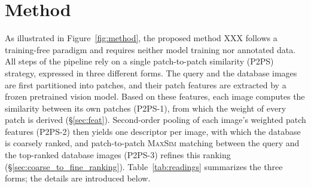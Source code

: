 \section{Method}
\label{sec:method}
As illustrated in Figure~\ref{fig:method}, the proposed method XXX follows a training-free paradigm and requires neither model training nor annotated data. All steps of the pipeline rely on a single patch-to-patch similarity (P2PS) strategy, expressed in three different forms. The query and the database images are first partitioned into patches, and their patch features are extracted by a frozen pretrained vision model. Based on these features, each image computes the similarity between its own patches (P2PS-1), from which the weight of every patch is derived (\S\ref{sec:feat}). Second-order pooling of each image's weighted patch features (P2PS-2) then yields one descriptor per image, with which the database is coarsely ranked, and patch-to-patch \textsc{MaxSim} matching between the query and the top-ranked database images (P2PS-3) refines this ranking (\S\ref{sec:coarse_to_fine_ranking}). Table~\ref{tab:readings} summarizes the three forms; the details are introduced below.
\begin{center}
\footnotesize\setlength{\tabcolsep}{5pt}\renewcommand{\arraystretch}{1.05}
\label{tab:readings}
\end{center}

